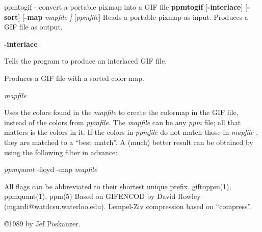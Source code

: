 %

\newpage
%

ppmtogif - convert a portable pixmap into a GIF file
{\bf ppmtogif}
{\rm [}{\bf -interlace}{\rm ]}
{\rm [}{\bf -sort}{\rm ]}
{\rm [}{\bf -map}
{\it mapfile ]}
{\rm [}{\it ppmfile}{\rm ]}
Reads a portable pixmap as input.
Produces a GIF file as output.
\begin{TPlist}{{\bf -interlace}}
\item[{{\bf -interlace}}]
Tells the program to produce an interlaced GIF file.
\item[{{\bf -sort}}]
Produces a GIF file with a sorted color map.
\item[{{\bf -map}}]
{\it mapfile}

Uses the colors found in the
{\it mapfile}
to create the colormap in the GIF file, instead of the colors from
{\it ppmfile.}
The
{\it mapfile}
can be any
{\it ppm}
file; all that matters is the colors in it. If the colors in
{\it ppmfile}
do not match those in
{\it mapfile}
, they are matched to a ``best match''. A (much) better result can be obtained by
using the following filter in advance:

{\it ppmquant}
-floyd -map
{\it mapfile}
\end{TPlist}

\par
All flags can be abbreviated to their shortest unique prefix.
giftoppm(1), ppmquant(1), ppm(5)
Based on GIFENCOD by David Rowley (mgardi@watdcsu.waterloo.edu).
Lempel-Ziv compression based on ``compress''.

\copyright 1989 by Jef Poskanzer.
%
%
 
